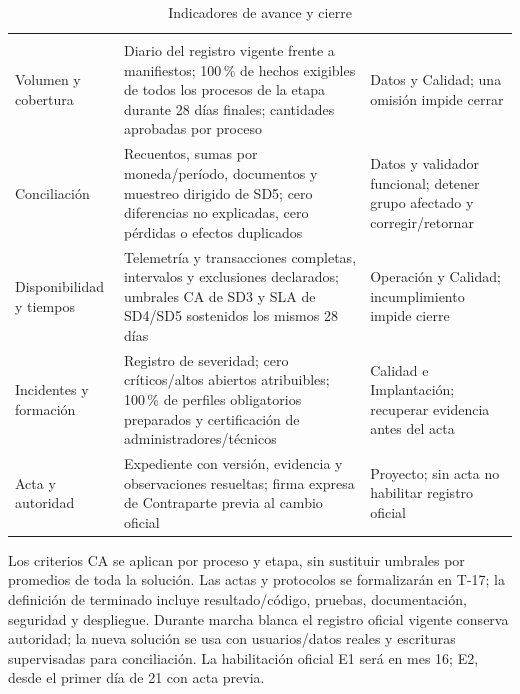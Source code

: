 \else

\begin{longtable}{L{35mm}L{69mm}L{45mm}}
\caption{Indicadores de avance y cierre}\label{tab:t18-indicadores}\\\hline
  &  & \\\hline\endfirsthead
\hline {} &  & \\\hline\endhead
Volumen y cobertura & Diario del registro vigente frente a manifiestos; 100\,\% de hechos exigibles de todos los procesos de la etapa durante 28 días finales; cantidades aprobadas por proceso & Datos y Calidad; una omisión impide cerrar\\\hline
Conciliación & Recuentos, sumas por moneda/período, documentos y muestreo dirigido de SD5; cero diferencias no explicadas, cero pérdidas o efectos duplicados & Datos y validador funcional; detener grupo afectado y corregir/retornar\\\hline
Disponibilidad y tiempos & Telemetría y transacciones completas, intervalos y exclusiones declarados; umbrales CA de SD3 y SLA de SD4/SD5 sostenidos los mismos 28 días & Operación y Calidad; incumplimiento impide cierre\\\hline
Incidentes y formación & Registro de severidad; cero críticos/altos abiertos atribuibles; 100\,\% de perfiles obligatorios preparados y certificación de administradores/técnicos & Calidad e Implantación; recuperar evidencia antes del acta\\\hline
Acta y autoridad & Expediente con versión, evidencia y observaciones resueltas; firma expresa de Contraparte previa al cambio oficial & Proyecto; sin acta no habilitar registro oficial\\\hline
\end{longtable}
\fi

Los criterios CA se aplican por proceso y etapa, sin sustituir umbrales por promedios de toda la solución. Las actas y protocolos se formalizarán en T-17; la definición de terminado incluye resultado/código, pruebas, documentación, seguridad y despliegue. Durante marcha blanca el registro oficial vigente conserva autoridad; la nueva solución se usa con usuarios/datos reales y escrituras supervisadas para conciliación. La habilitación oficial E1 será en mes 16; E2, desde el primer día de 21 con acta previa.~\parencite[arts.~17--18; pp.~12--13]{bases-admin}~\parencite[RT-20.04/07/08; p.~35]{bases-transversales}




